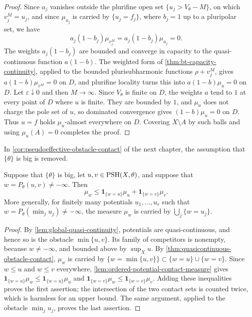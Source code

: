 \begin{proof}
Since $a_j$ vanishes outside the plurifine open set $\{u_j>V_\theta-M\}$, on which $v_j^M=u_j$, and since $\mu_{u_j}$ is carried by $\{u_j=f_j\}$, where $b_j=1$ up to a pluripolar set, we have
\[
 a_j(1-b_j)\mu_{v_j^M}=a_j(1-b_j)\mu_{u_j}=0.
\]
The weights $a_j(1-b_j)$ are bounded and converge in capacity to the quasi-continuous function $a(1-b)$. The weighted form of \cref{thm:bt-capacity-continuity}, applied to the bounded plurisubharmonic functions $\rho+v_j^M$, gives $a(1-b)\mu_{v^M}=0$ on $D$, and plurifine locality turns this into $a(1-b)\mu_u=0$ on $D$. Let $\varepsilon\downarrow0$ and then $M\to\infty$. Since $V_\theta$ is finite on $D$, the weights $a$ tend to $1$ at every point of $D$ where $u$ is finite. They are bounded by $1$, and $\mu_u$ does not charge the pole set of $u$, so dominated convergence gives $(1-b)\mu_u=0$ on $D$. Thus $u=f$ holds $\mu_u$-almost everywhere on $D$. Covering $X\setminus A$ by such balls and using $\mu_u(A)=0$ completes the proof.
\end{proof}

In \cref{cor:pseudoeffective-obstacle-contact} of the next chapter, the assumption that $\{\theta\}$ is big is removed.

\begin{corollary}\label{cor:rooftop-contact-inequality}
Suppose that $\{\theta\}$ is big, let $u,v\in\mathrm{PSH}(X,\theta)$, and suppose that $w=P_\theta(u,v)\ne-\infty$. Then
\[
 \mu_w\leq\mathbf1_{\{w=u\}}\mu_u
                       +\mathbf1_{\{w=v\}}\mu_v.
\]
More generally, for finitely many potentials $u_1,\ldots,u_r$ such that $w=P_\theta(\min_ju_j)\ne-\infty$, the measure $\mu_w$ is carried by $\bigcup_j\{w=u_j\}$.
\end{corollary}
\begin{proof}
By \cref{lem:global-quasi-continuity}, potentials are quasi-continuous, and hence so is the obstacle $\min\{u,v\}$. Its family of competitors is nonempty, because $w\ne-\infty$, and bounded above by $\sup_Xu$. By \cref{thm:quasicontinuous-obstacle-contact}, $\mu_w$ is carried by $\{w=\min\{u,v\}\}\subset\{w=u\}\cup\{w=v\}$. Since $w\leq u$ and $w\leq v$ everywhere, \cref{lem:ordered-potential-contact-measure} gives $\mathbf1_{\{w=u\}}\mu_w\leq\mathbf1_{\{w=u\}}\mu_u$ and $\mathbf1_{\{w=v\}}\mu_w\leq\mathbf1_{\{w=v\}}\mu_v$. Adding these inequalities proves the first assertion; the intersection of the two contact sets is counted twice, which is harmless for an upper bound. The same argument, applied to the obstacle $\min_ju_j$, proves the last assertion.
\end{proof}

